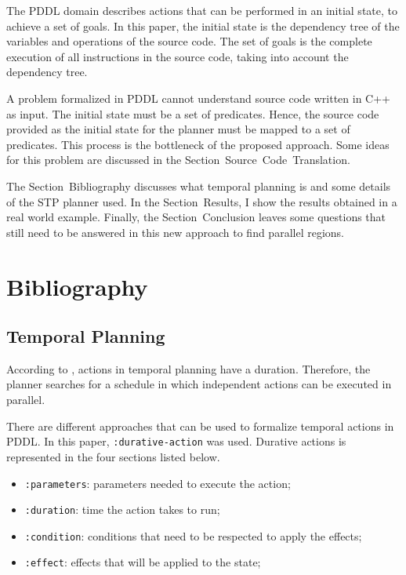 \documentclass[letterpaper]{article}
\begin{document}
The PDDL domain describes actions that can be performed in an initial state, to achieve a set of goals. In this paper, the initial state is the dependency tree of the variables and operations of the source code. The set of goals is the complete execution of all instructions in the source code, taking into account the dependency tree.

A problem formalized in PDDL cannot understand source code written in C++ as input. The initial state must be a set of predicates. Hence, the source code provided as the initial state for the planner must be mapped to a set of predicates. This process is the bottleneck of the proposed approach. Some ideas for this problem are discussed in the Section~Source~Code~Translation.

The Section~Bibliography discusses what temporal planning is and some details of the STP planner used. In the Section~Results, I show the results obtained in a real world example. Finally, the Section~Conclusion leaves some questions that still need to be answered in this new approach to find parallel regions.


\section{Bibliography}

\subsection{Temporal Planning} \label{label:temporal-planning}

According to \cite{DBLP:series/synthesis/2019Haslum}, actions in temporal planning have a duration. Therefore, the planner searches for a schedule in which independent actions can be executed in parallel.

There are different approaches that can be used to formalize temporal actions in PDDL. In this paper, \texttt{:durative-action} was used. Durative actions is represented in the four sections listed below.

\begin{itemize}
    \item \texttt{:parameters}: parameters needed to execute the action;
    \item \texttt{:duration}: time the action takes to run;
    \item \texttt{:condition}: conditions that need to be respected to apply the effects;
    \item \texttt{:effect}: effects that will be applied to the state;
\end{itemize}
\end{document}
